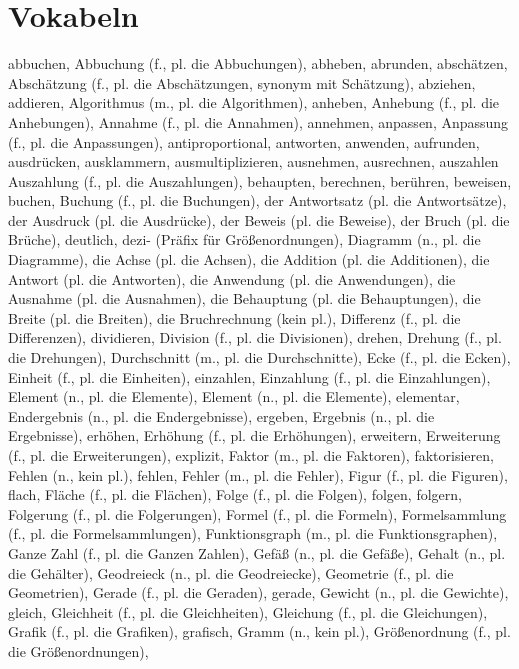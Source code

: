 \section{Vokabeln}

abbuchen,
Abbuchung (f., pl. die Abbuchungen),
abheben,
abrunden,
abschätzen,
Abschätzung (f., pl. die Abschätzungen, synonym mit Schätzung),
abziehen,
addieren,
Algorithmus (m., pl. die Algorithmen),
anheben,
Anhebung (f., pl. die Anhebungen),
Annahme (f., pl. die Annahmen),
annehmen,
anpassen,
Anpassung (f., pl. die Anpassungen),
antiproportional,
antworten,
anwenden,
aufrunden,
ausdrücken,
ausklammern,
ausmultiplizieren,
ausnehmen,
ausrechnen,
auszahlen
Auszahlung (f., pl. die Auszahlungen),
behaupten,
berechnen,
berühren,
beweisen,
buchen,
Buchung (f., pl. die Buchungen),
der Antwortsatz (pl. die Antwortsätze),
der Ausdruck (pl. die Ausdrücke),
der Beweis (pl. die Beweise),
der Bruch (pl. die Brüche),
deutlich,
dezi- (Präfix für Größenordnungen),
Diagramm (n., pl. die Diagramme),
die Achse (pl. die Achsen),
die Addition (pl. die Additionen),
die Antwort (pl. die Antworten),
die Anwendung (pl. die Anwendungen),
die Ausnahme (pl. die Ausnahmen),
die Behauptung (pl. die Behauptungen),
die Breite (pl. die Breiten),
die Bruchrechnung (kein pl.),
Differenz (f., pl. die Differenzen),
dividieren,
Division (f., pl. die Divisionen),
drehen,
Drehung (f., pl. die Drehungen),
Durchschnitt (m., pl. die Durchschnitte),
Ecke (f., pl. die Ecken),
Einheit (f., pl. die Einheiten),
einzahlen,
Einzahlung (f., pl. die Einzahlungen),
Element (n., pl. die Elemente),
Element (n., pl. die Elemente),
elementar,
Endergebnis (n., pl. die Endergebnisse),
ergeben,
Ergebnis (n., pl. die Ergebnisse),
erhöhen,
Erhöhung (f., pl. die Erhöhungen),
erweitern,
Erweiterung (f., pl. die Erweiterungen),
explizit,
Faktor (m., pl. die Faktoren),
faktorisieren,
Fehlen (n., kein pl.),
fehlen,
Fehler (m., pl. die Fehler),
Figur (f., pl. die Figuren),
flach,
Fläche (f., pl. die Flächen),
Folge (f., pl. die Folgen),
folgen,
folgern,
Folgerung (f., pl. die Folgerungen),
Formel (f., pl. die Formeln),
Formelsammlung (f., pl. die Formelsammlungen),
Funktionsgraph (m., pl. die Funktionsgraphen),
Ganze Zahl (f., pl. die Ganzen Zahlen),
Gefäß (n., pl. die Gefäße),
Gehalt (n., pl. die Gehälter),
Geodreieck (n., pl. die Geodreiecke),
Geometrie (f., pl. die Geometrien),
Gerade (f., pl. die Geraden),
gerade,
Gewicht (n., pl. die Gewichte),
gleich,
Gleichheit (f., pl. die Gleichheiten),
Gleichung (f., pl. die Gleichungen),
Grafik (f., pl. die Grafiken),
grafisch,
Gramm (n., kein pl.),
Größenordnung (f., pl. die Größenordnungen),
